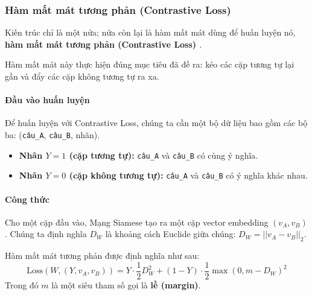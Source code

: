 \begin{center}
    \label{fig:siamese_network_architecture}
\end{center}

\subsubsection{Hàm mất mát tương phản (Contrastive Loss)}
\label{ssec:contrastive_loss}
Kiến trúc chỉ là một nửa; nửa còn lại là hàm mất mát dùng để huấn luyện nó, \textbf{hàm mất mát tương phản (Contrastive Loss) \cite{hadsell2006dimensionality}}.

Hàm mất mát này thực hiện đúng mục tiêu đã đề ra: kéo các cặp tương tự lại gần và đẩy các cặp không tương tự ra xa.

\paragraph{Đầu vào huấn luyện}
Để huấn luyện với Contrastive Loss, chúng ta cần một bộ dữ liệu bao gồm các bộ ba: (\texttt{câu\_A}, \texttt{câu\_B}, nhãn).
\begin{itemize}
    \item \textbf{Nhãn $Y=1$ (cặp tương tự):} \texttt{câu\_A} và \texttt{câu\_B} có cùng ý nghĩa.
    \item \textbf{Nhãn $Y=0$ (cặp không tương tự):} \texttt{câu\_A} và \texttt{câu\_B} có ý nghĩa khác nhau.
\end{itemize}


\paragraph{Công thức}
Cho một cặp đầu vào, Mạng Siamese tạo ra một cặp vector embedding $(v_A, v_B)$. Chúng ta định nghĩa $D_W$ là khoảng cách Euclide giữa chúng: $D_W = ||v_A - v_B||_2$.

Hàm mất mát tương phản được định nghĩa như sau:
\begin{equation}
    \text{Loss}(W, (Y, v_A, v_B)) = Y \cdot \frac{1}{2} D_W^2 + (1-Y) \cdot \frac{1}{2} \max(0, m - D_W)^2
    \label{eq:contrastive_loss}
\end{equation}
Trong đó $m$ là một siêu tham số gọi là \textbf{lề (margin)}.

